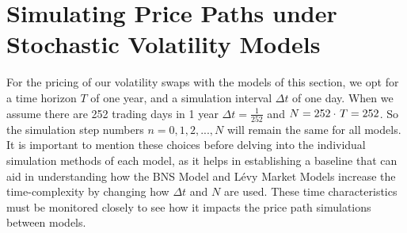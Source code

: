 
\section{Simulating Price Paths under Stochastic Volatility Models}

For the pricing of our volatility swaps with the models of this section, we opt for a time horizon $T$ of one year, and a simulation interval  $\Delta t$ of one day. When we assume there are 252 trading days in 1 year $\Delta t = \frac{1}{252}$ and $N = 252 \cdot \hspace{0.1em}T = 252$. So the simulation step numbers $n = 0,1,2,...,N$ will remain the same for all models. It is important to mention these choices before delving into the individual simulation methods of each model, as it helps in establishing a baseline that can aid in understanding how the BNS Model and Lévy Market Models increase the time-complexity by changing how $\Delta t$ and $N$ are used. These time characteristics must be monitored closely to see how it impacts the price path simulations between models.\\



